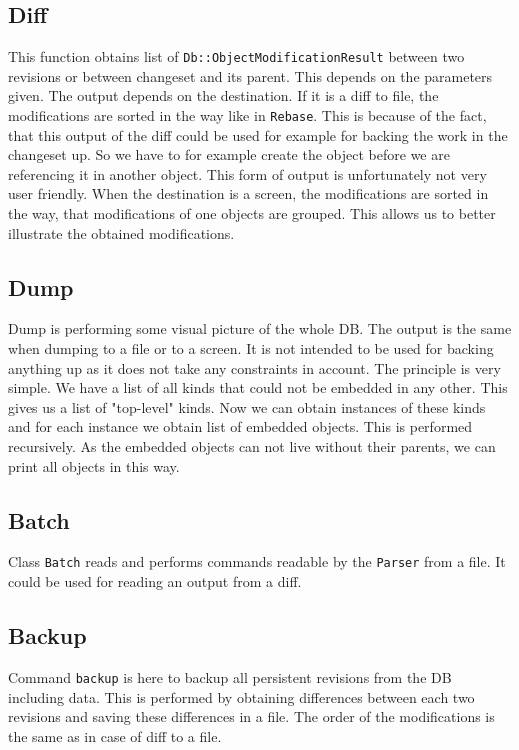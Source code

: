\documentclass[deska]{subfiles}
\begin{document}
\subsection{Diff}

This function obtains list of {\tt Db::ObjectModificationResult} between two revisions or between changeset and its parent.
This depends on the parameters given. The output depends on the destination. If it is a diff to file, the modifications
are sorted in the way like in {\tt Rebase}. This is because of the fact, that this output of the diff could be used for
example for backing the work in the changeset up. So we have to for example create the object before we are referencing it
in another object. This form of output is unfortunately not very user friendly. When the destination is a screen, the
modifications are sorted in the way, that modifications of one objects are grouped. This allows us to better illustrate
the obtained modifications.

\subsection{Dump}

Dump is performing some visual picture of the whole DB. The output is the same when dumping to a file or to a screen.
It is not intended to be used for backing anything up as it does not take any constraints in account.
The principle is very simple. We have a list of all kinds that could not be embedded in any other. This gives us a list
of "top-level" kinds. Now we can obtain instances of these kinds and for each instance we obtain list of embedded objects.
This is performed recursively. As the embedded objects can not live without their parents, we can print all objects in this way.

\subsection{Batch}

Class {\tt Batch} reads and performs commands readable by the {\tt Parser} from a file. It could be used for reading
an output from a diff.

\subsection{Backup}

Command {\tt backup} is here to backup all persistent revisions from the DB including data. This is performed by obtaining
differences between each two revisions and saving these differences in a file. The order of the modifications is the same
as in case of diff to a file.
\end{document}
